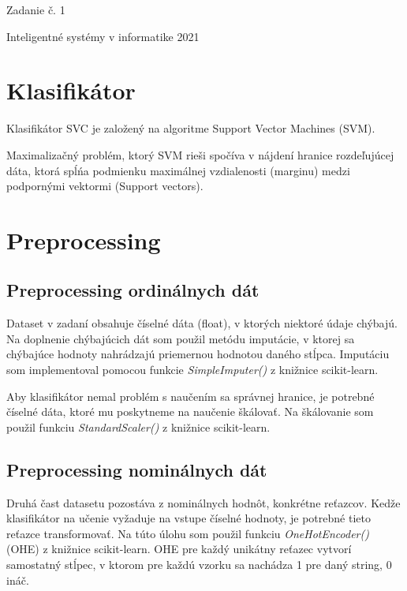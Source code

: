 \documentclass[12pt]{article}
\begin{document}
    \thispagestyle{empty}

	\centerline{{\Huge Zadanie \v{c}. {1}}}

    \bigskip

    \centerline{{\Large Inteligentné systémy v informatike 2021}}

    \section{Klasifikátor}

    Klasifikátor SVC je založený na algoritme Support Vector Machines (SVM).

    Maximalizačný problém, ktorý SVM rieši spočíva v nájdení hranice rozdeľujúcej dáta, ktorá
    spĺńa podmienku maximálnej vzdialenosti (marginu) medzi podpornými vektormi (Support vectors).

    \section{Preprocessing}

    \subsection{Preprocessing ordinálnych dát}
        Dataset v zadaní obsahuje číselné dáta (float), v ktorých niektoré 
        údaje chýbajú.
        Na doplnenie chýbajúcich dát som použil metódu imputácie, v ktorej
        sa chýbajúce hodnoty nahrádzajú priemernou hodnotou daného stĺpca.
        Imputáciu som implementoval pomocou funkcie \emph{SimpleImputer()} z knižnice scikit-learn.

        Aby klasifikátor nemal problém s naučením sa správnej hranice, je potrebné 
        číselné dáta, ktoré mu poskytneme na naučenie škálovať. Na škálovanie som použil
        funkciu \emph{StandardScaler()} z knižnice scikit-learn.

    \subsection{Preprocessing nominálnych dát}
        Druhá čast datasetu pozostáva z nominálnych hodnôt, konkrétne reťazcov.
        Kedže klasifikátor na učenie vyžaduje na vstupe číselné hodnoty, je potrebné tieto
        reťazce transformovať. Na túto úlohu som použil funkciu
        \emph{OneHotEncoder()} (OHE) z knižnice scikit-learn. OHE pre každý unikátny
        reťazec vytvorí samostatný stĺpec, v ktorom pre každú vzorku sa nachádza 1 pre daný string, 0 ináč.
\end{document}
